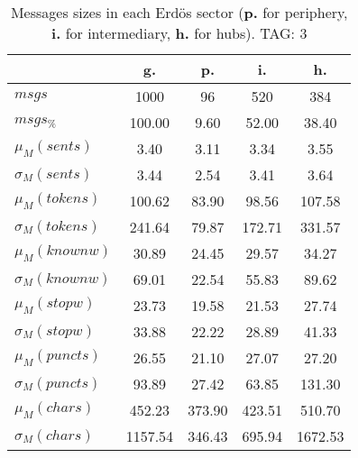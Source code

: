 \begin{table}[h!]
\begin{center}
\begin{tabular}{| l || c | c | c | c |}\hline
 & {\bf g.} & {\bf p.} & {\bf i.} & {\bf h.} \\\hline\hline
$msgs$ & 1000  & 96  & 520  & 384 \\
$msgs_{\%}$ & 100.00  & 9.60  & 52.00  & 38.40 \\\hline
$\mu_M(sents)$ & 3.40  & 3.11  & 3.34  & 3.55 \\
$\sigma_M(sents)$ & 3.44  & 2.54  & 3.41  & 3.64 \\\hline
$\mu_M(tokens)$ & 100.62  & 83.90  & 98.56  & 107.58 \\
$\sigma_M(tokens)$ & 241.64  & 79.87  & 172.71  & 331.57 \\\hline
$\mu_M(knownw)$ & 30.89  & 24.45  & 29.57  & 34.27 \\
$\sigma_M(knownw)$ & 69.01  & 22.54  & 55.83  & 89.62 \\\hline
$\mu_M(stopw)$ & 23.73  & 19.58  & 21.53  & 27.74 \\
$\sigma_M(stopw)$ & 33.88  & 22.22  & 28.89  & 41.33 \\\hline
$\mu_M(puncts)$ & 26.55  & 21.10  & 27.07  & 27.20 \\
$\sigma_M(puncts)$ & 93.89  & 27.42  & 63.85  & 131.30 \\\hline
$\mu_M(chars)$ & 452.23  & 373.90  & 423.51  & 510.70 \\
$\sigma_M(chars)$ & 1157.54  & 346.43  & 695.94  & 1672.53 \\\hline
\end{tabular}
\caption{Messages sizes in each Erd\"os sector ({{\bf p.}} for periphery, {{\bf i.}} for intermediary, {{\bf h.}} for hubs). TAG: 3}
\end{center}
\end{table}